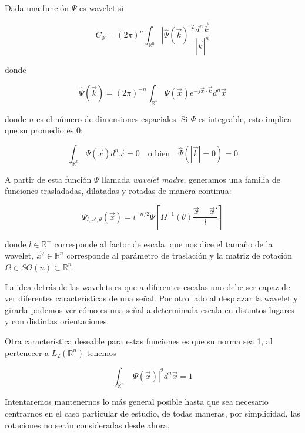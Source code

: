 \documentclass[conference]{IEEEtran}
\begin{document}
Dada una función $\Psi$ es wavelet si

\begin{equation}
  C_\Psi = (2\pi)^n\int_{\mathds{R}^n} |\hat{\Psi}(\vec{k})|^2 \frac{d^n \vec{k}}{|\vec{k}|^n}
\end{equation}

donde

\begin{equation}
  \hat{\Psi}(\vec{k}) =(2 \pi)^{-n}\int_{\mathds{R}^n} \Psi(\vec{x}) e^{-j\vec{x}\cdot \vec{k}} d^n \vec{x}
\end{equation}

donde $n$ es el número de dimensiones espaciales. Si $\Psi$ es integrable, esto implica que su promedio es 0:

\begin{equation}
  \int_{\mathds{R}^n} \Psi(\vec{x})d^n\vec{x} = 0 \quad\text{o bien}\quad \hat{\Psi}(|\vec{k}|=0)=0
\end{equation}


A partir de esta función $\Psi$ llamada \emph{wavelet madre}, generamos una familia de funciones trasladadas, dilatadas y rotadas de manera continua:

\begin{equation}
  \Psi_{l,x',\theta}(\vec{x}) = l^{-n/2}\Psi \left[\Omega^{-1}(\theta)\frac{\vec{x}-\vec{x}'}{l} \right]
\end{equation}

donde $l \in \mathds{R}^+$ corresponde al factor de escala, que nos dice el tamaño de la wavelet, $\vec{x}' \in \mathds{R}^n$ corresponde al parámetro de traslación y la matriz de rotación $\Omega \in SO(n) \subset  \mathds{R}^n$.

La idea detrás de las wavelets es que a diferentes escalas uno debe ser capaz de ver diferentes características de una señal. Por otro lado al desplazar la wavelet y girarla podemos ver cómo es una señal a determinada escala en distintos lugares y con distintas orientaciones.

Otra característica deseable para estas funciones es que su norma sea 1, al pertenecer a $L_2(\mathds{R}^n)$ tenemos

\begin{equation}
  \int_{\mathds{R}^n} |\Psi (\vec{x})|^2 d^n\vec{x} = 1
\end{equation}






Intentaremos mantenernos lo más general posible hasta que sea necesario centrarnos en el caso particular de estudio, de todas maneras, por simplicidad, las rotaciones no serán consideradas desde ahora.
\end{document}
